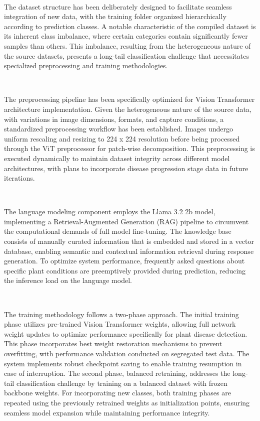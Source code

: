 \

The dataset structure has been deliberately designed to facilitate seamless integration of new data, with the training folder organized hierarchically according to prediction classes. A notable characteristic of the compiled dataset is its inherent class imbalance, where certain categories contain significantly fewer samples than others. This imbalance, resulting from the heterogeneous nature of the source datasets, presents a long-tail classification challenge that necessitates specialized preprocessing and training methodologies.

\

The preprocessing pipeline has been specifically optimized for Vision Transformer architecture implementation. Given the heterogeneous nature of the source data, with variations in image dimensions, formats, and capture conditions, a standardized preprocessing workflow has been established. Images undergo uniform rescaling and resizing to 224 x 224 resolution before being processed through the ViT preprocessor for patch-wise decomposition. This preprocessing is executed dynamically to maintain dataset integrity across different model architectures, with plans to incorporate disease progression stage data in future iterations.

\

The language modeling component employs the Llama 3.2 2b model, implementing a Retrieval-Augmented Generation (RAG) pipeline to circumvent the computational demands of full model fine-tuning. The knowledge base consists of manually curated information that is embedded and stored in a vector database, enabling semantic and contextual information retrieval during response generation. To optimize system performance, frequently asked questions about specific plant conditions are preemptively provided during prediction, reducing the inference load on the language model.

\

The training methodology follows a two-phase approach. The initial training phase utilizes pre-trained Vision Transformer weights, allowing full network weight updates to optimize performance specifically for plant disease detection. This phase incorporates best weight restoration mechanisms to prevent overfitting, with performance validation conducted on segregated test data. The system implements robust checkpoint saving to enable training resumption in case of interruption. The second phase, balanced retraining, addresses the long-tail classification challenge by training on a balanced dataset with frozen backbone weights. For incorporating new classes, both training phases are repeated using the previously retrained weights as initialization points, ensuring seamless model expansion while maintaining performance integrity.

